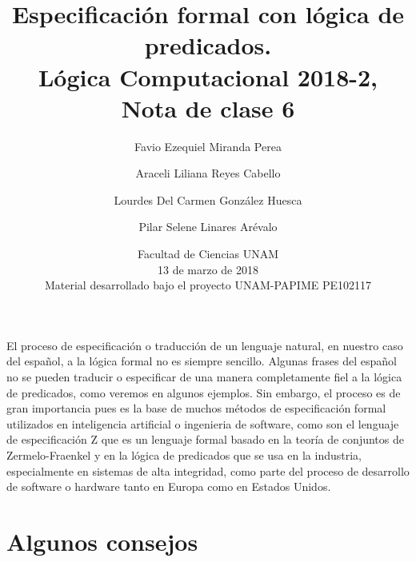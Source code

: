 \documentclass[11pt,letterpaper]{article}
\title{Especificación formal con lógica de predicados. \\ 
Lógica Computacional 2018-2, Nota de clase 6}
\author{Favio Ezequiel Miranda Perea \and Araceli Liliana Reyes Cabello \and
Lourdes Del Carmen Gonz\'alez Huesca \and Pilar Selene Linares Ar\'evalo}
\date{ Facultad de Ciencias UNAM \\ 13 de marzo de 2018 \\
Material desarrollado bajo el proyecto UNAM-PAPIME PE102117}
\begin{document}
\maketitle

El proceso de especificación o traducción de un lenguaje natural, en 
nuestro caso del español, a la lógica formal no es siempre sencillo. Algunas 
frases del español no se pueden traducir o especificar de una manera 
completamente fiel a la lógica de predicados, como veremos en algunos ejemplos. 
Sin embargo, el proceso es de gran importancia pues es la base de muchos métodos 
de especificación formal utilizados en inteligencia artificial o ingenieria de 
software, como son el lenguaje de especificación \textsc{Z} que es un lenguaje 
formal basado en la teoría de conjuntos de Zermelo-Fraenkel y en la lógica de 
predicados que se usa en la industria, especialmente en sistemas de alta 
integridad, como parte del proceso de desarrollo de software o hardware
tanto en Europa como en Estados Unidos. %

\section{Algunos consejos}
\end{document}
